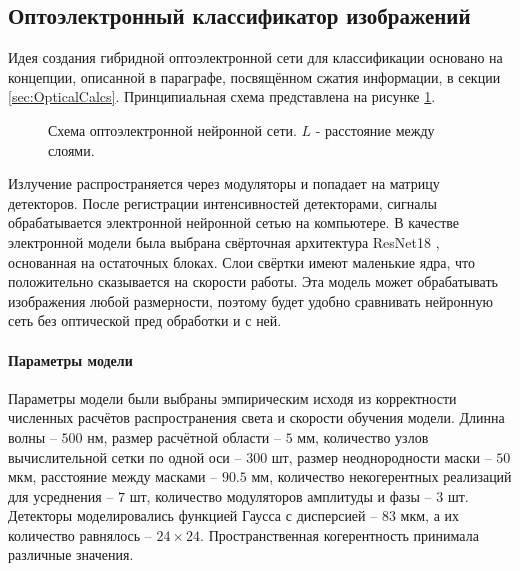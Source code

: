 \subsection{Оптоэлектронный классификатор изображений}
Идея создания гибридной оптоэлектронной сети для классификации основано на концепции, описанной в параграфе, посвящённом сжатия информации, в секции \ref{sec:OpticalCalcs}. Принципиальная схема представлена на рисунке \ref{ris:OEScheme}.
\begin{figure}[h]
	\caption{Схема оптоэлектронной нейронной сети. $L$ - расстояние между слоями.}
	\label{ris:OEScheme}
\end{figure}
Излучение распространяется через модуляторы и попадает на матрицу детекторов. После регистрации интенсивностей детекторами, сигналы обрабатывается электронной нейронной сетью на компьютере. В качестве электронной модели была выбрана свёрточная архитектура ResNet18 \cite{he2016deep}, основанная на остаточных блоках. Слои свёртки  имеют маленькие ядра, что положительно сказывается на скорости работы. Эта модель может обрабатывать изображения любой размерности, поэтому будет удобно сравнивать нейронную сеть без оптической пред обработки и с ней.

\paragraph{Параметры модели}
Параметры модели были выбраны эмпирическим исходя из корректности численных расчётов распространения света и скорости обучения модели. Длинна волны -- $500$ нм, размер расчётной области -- $5$ мм, количество узлов вычислительной сетки по одной оси -- $300$ шт, размер неоднородности маски -- $50$ мкм, расстояние между масками -- $90.5$ мм, количество некогерентных реализаций для усреднения -- $7$ шт, количество модуляторов амплитуды и фазы -- $3$ шт. Детекторы моделировались функцией Гаусса с дисперсией -- $83$ мкм, а их количество равнялось -- $24 \times 24$. Пространственная когерентность принимала различные значения.

